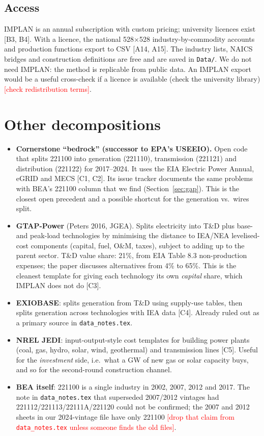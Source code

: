 \documentclass[11pt]{article}
\newcommand{\todo}[1]{\textcolor{red}{[#1]}}
\begin{document}
\subsection{Access}
IMPLAN is an annual subscription with custom pricing; university licences exist [B3, B4]. With a licence, the national 528$\times$528 industry-by-commodity accounts and production functions export to CSV [A14, A15]. The industry lists, NAICS bridges and construction definitions are free and are saved in \texttt{Data/}. We do not need IMPLAN: the method is replicable from public data. An IMPLAN export would be a useful cross-check if a licence is available (check the university library) \todo{check redistribution terms}.

\section{Other decompositions}\label{sec:other}
\begin{itemize}
  \item \textbf{Cornerstone ``bedrock'' (successor to EPA's USEEIO).} Open code that splits 221100 into generation (221110), transmission (221121) and distribution (221122) for 2017--2024. It uses the EIA Electric Power Annual, eGRID and MECS [C1, C2]. Its issue tracker documents the same problems with BEA's 221100 column that we find (Section~\ref{sec:gap}). This is the closest open precedent and a possible shortcut for the generation vs.\ wires split.
  \item \textbf{GTAP-Power} (Peters 2016, JGEA). Splits electricity into T\&D plus base- and peak-load technologies by minimising the distance to IEA/NEA levelised-cost components (capital, fuel, O\&M, taxes), subject to adding up to the parent sector. T\&D value share: 21\%, from EIA Table 8.3 non-production expenses; the paper discusses alternatives from 4\% to 65\%. This is the cleanest template for giving each technology its own \emph{capital} share, which IMPLAN does not do [C3].
  \item \textbf{EXIOBASE}: splits generation from T\&D using supply-use tables, then splits generation across technologies with IEA data [C4]. Already ruled out as a primary source in \texttt{data\_notes.tex}.
  \item \textbf{NREL JEDI}: input-output-style cost templates for building power plants (coal, gas, hydro, solar, wind, geothermal) and transmission lines [C5]. Useful for the \emph{investment} side, i.e.\ what a GW of new gas or solar capacity buys, and so for the second-round construction channel.
  \item \textbf{BEA itself}: 221100 is a single industry in 2002, 2007, 2012 and 2017. The note in \texttt{data\_notes.tex} that superseded 2007/2012 vintages had 221112/221113/22111A/221120 could not be confirmed; the 2007 and 2012 sheets in our 2024-vintage file have only 221100 \todo{drop that claim from \texttt{data\_notes.tex} unless someone finds the old files}.
\end{itemize}
\end{document}
